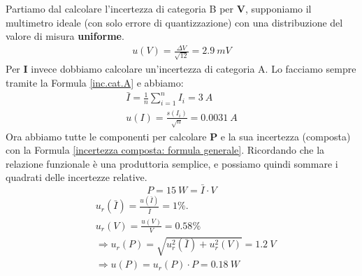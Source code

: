 \documentclass[a4paper,11pt]{report}
\begin{document}
Partiamo dal calcolare l'incertezza di categoria B per \textbf{V}, supponiamo il multimetro ideale (con solo errore di quantizzazione) con una distribuzione del valore di misura \textbf{uniforme}.
\begin{align*}
  u(V) = \frac{\Delta V}{\sqrt{12}} = 2.9~mV
\end{align*}
Per \textbf{I} invece dobbiamo calcolare un'incertezza di categoria A. Lo facciamo sempre tramite la Formula \ref{inc.cat.A} e abbiamo:
\begin{align*}
  \bar{I} = \frac{1}{n}\sum^n_{i=1}I_i = 3~A \\
  u(I) = \frac{s(I_i)}{\sqrt{n}} = 0.0031~A
\end{align*}
Ora abbiamo tutte le componenti per calcolare \textbf{P} e la sua incertezza (composta) con la Formula \ref{incertezza composta: formula generale}. Ricordando che la relazione funzionale è una produttoria semplice, e possiamo quindi sommare i quadrati delle incertezze relative.
$$
  P = 15~W = \bar{I}\cdot V
$$
\begin{align*}
  &u_r(\bar{I}) = \frac{u(\bar{I})}{\bar{I}} = 1\%.\\
  &u_r(V) = \frac{u(V)}{V} = 0.58\%\\
  &\Rightarrow
  u_r(P) = \sqrt{u_r^2(\bar{I})+u_r^2(V)} = 1.2~V \\
  &\Rightarrow
  u(P) = u_r(P)\cdot P = 0.18~W
\end{align*}
\end{document}
